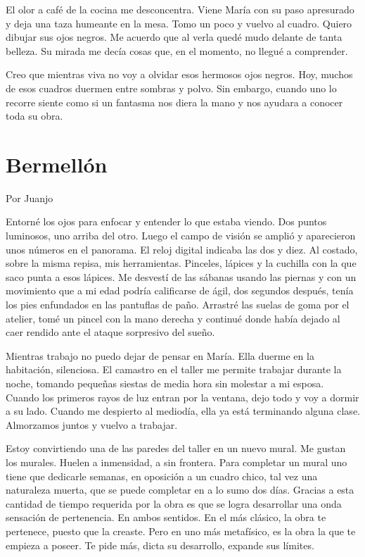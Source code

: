 \documentclass[11pt,twoside,openright,a5paper]{book}
\begin{document}
El olor a café de la cocina me desconcentra. Viene María con su paso apresurado y deja una taza humeante en la mesa. Tomo un poco y vuelvo al cuadro. Quiero dibujar sus ojos negros. Me acuerdo que al verla quedé mudo delante de tanta belleza. Su mirada me decía cosas que, en el momento, no llegué a comprender. 

Creo que mientras viva no voy a olvidar esos hermosos ojos negros.
Hoy, muchos de esos cuadros duermen entre sombras y polvo. Sin embargo, cuando uno lo recorre siente como si un fantasma nos diera la mano y nos ayudara a conocer toda su obra.

\section*{Bermellón}

                                                                                                        \begin{flushright}Por Juanjo\end{flushright}

Entorné los ojos para enfocar y entender lo que estaba viendo. Dos puntos luminosos, uno arriba del otro. Luego el campo de visión se amplió y aparecieron unos números en el panorama. El reloj digital indicaba las dos y diez. Al costado, sobre la misma repisa, mis herramientas. Pinceles, lápices y la cuchilla con la que saco punta a esos lápices. Me desvestí de las sábanas usando las piernas y con un movimiento que a mi edad podría calificarse de ágil, dos segundos después, tenía los pies enfundados en las pantuflas de paño. Arrastré las suelas de goma por el atelier, tomé un pincel con la mano derecha y continué donde había dejado al caer rendido ante el ataque sorpresivo del sueño.

Mientras trabajo no puedo dejar de pensar en María. Ella duerme en la habitación, silenciosa. El camastro en el taller me permite trabajar durante la noche, tomando pequeñas siestas de media hora sin molestar a mi esposa. Cuando los primeros rayos de luz entran por la ventana, dejo todo y voy a dormir a su lado. Cuando me despierto al mediodía, ella ya está terminando alguna clase. Almorzamos juntos y vuelvo a trabajar.

Estoy convirtiendo una de las paredes del taller en un nuevo mural. Me gustan los murales. Huelen a inmensidad, a sin frontera. Para completar un mural uno tiene que dedicarle semanas, en oposición a un cuadro chico, tal vez una naturaleza muerta, que se puede completar en a lo sumo dos días. Gracias a esta cantidad de tiempo requerida por la obra es que se logra desarrollar una onda sensación de pertenencia. En ambos sentidos. En el más clásico, la obra te pertenece, puesto que la creaste. Pero en uno más metafísico, es la obra la que te empieza a poseer. Te  pide más, dicta su desarrollo, expande sus límites. 
\end{document}
